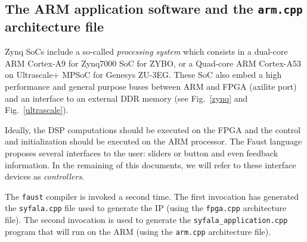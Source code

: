 \documentclass[11pt]{article}
\numberwithin{equation}{section}
\numberwithin{figure}{section}
\begin{document}
\subsection{The ARM application software  and the {\tt arm.cpp} architecture file}
\label{sec:arm}


Zynq SoCs include a so-called {\em processing system} which consists in a
 dual-core ARM Cortex-A9 for Zynq7000 SoC for ZYBO, or a Quad-core ARM Cortex-A53 on Ultrascale+ MPSoC for Genesys ZU-3EG.
These SoC also embed a high performance and general purpose buses between ARM and FPGA (axilite port) and an interface to an external DDR memory (see Fig.~\ref{zynq} and Fig.~\ref{ultrascale}). 

Ideally, the DSP computations should be executed on the FPGA and the control and initialization should be executed on  the ARM processor.  The Faust language proposes several interfaces to the user: sliders or button and even feedback information. In the remaining of this documents, we will refer to these interface devices as {\em controllers}.

The {\tt faust}  compiler is invoked a second time. The first invocation  has generated the {\tt syfala.cpp} file used to generate the IP (using the {\tt fpga.cpp} architecture file). The second invocation is used to generate the {\tt syfala\_application.cpp} program that will run on the ARM (using the {\tt arm.cpp} architecture file).
\end{document}
